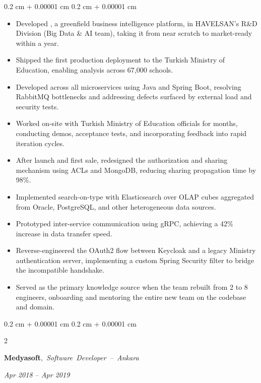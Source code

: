 \documentclass[10pt, letterpaper]{article}
\newenvironment{highlights}{
    \begin{itemize}[
        topsep=0.10 cm,
        parsep=0.10 cm,
        partopsep=0pt,
        itemsep=0pt,
        leftmargin=0.4 cm + 10pt
    ]
}{
    \end{itemize}
} %
\newenvironment{onecolentry}{
    \begin{adjustwidth}{
        0.2 cm + 0.00001 cm
    }{
        0.2 cm + 0.00001 cm
    }
}{
    \end{adjustwidth}
} %
\newenvironment{twocolentry}[2][]{
    \onecolentry
    \def\secondColumn{#2}
    \setcolumnwidth{\fill, 4.5 cm}
    \begin{paracol}{2}
}{
    \switchcolumn \raggedleft \secondColumn
    \end{paracol}
    \endonecolentry
} %
\let\hrefWithoutArrow\href
\renewcommand{\href}[2]{\hrefWithoutArrow{#1}{\ifthenelse{\equal{#2}{}}{ }{#2 }\raisebox{.15ex}{\footnotesize \faExternalLink*}}}
\begin{document}
        \vspace{0.10 cm}
        \begin{onecolentry}
            \begin{highlights}
            \item Developed \href{https://www.youtube.com/watch?v=YnbQ9wY3OYE}{Astar-BI}, a greenfield business intelligence platform, in HAVELSAN's R\&D Division (Big Data \& AI team), taking it from near scratch to market-ready within a year.
\item Shipped the first production deployment to the Turkish Ministry of Education, enabling analysis across \raisebox{0.3ex}{\scalebox{0.7}{$\sim$}}67,000 schools.
\item Developed across all microservices using Java and Spring Boot, resolving RabbitMQ bottlenecks and addressing defects surfaced by external load and security tests.
\pagebreak
\item Worked on-site with Turkish Ministry of Education officials for months, conducting demos, acceptance tests, and incorporating feedback into rapid iteration cycles.
\item After launch and first sale, redesigned the authorization and sharing mechanism using ACLs and MongoDB, reducing sharing propagation time by 98\%.
\item Implemented search-on-type with Elasticsearch over OLAP cubes aggregated from Oracle, PostgreSQL, and other heterogeneous data sources.
\item Prototyped inter-service communication using gRPC, achieving a 42\% increase in data transfer speed.
\item Reverse-engineered the OAuth2 flow between Keycloak and a legacy Ministry authentication server, implementing a custom Spring Security filter to bridge the incompatible handshake.
\item Served as the primary knowledge source when the team rebuilt from 2 to 8 engineers, onboarding and mentoring the entire new team on the codebase and domain.
            \end{highlights}
        \end{onecolentry}

        \vspace{0.35 cm}

        \begin{twocolentry}{
        \textit{Apr 2018 – Apr 2019}}
            \mbox{\textbf{Medyasoft},
            \textit{Software Developer -- Ankara}
            }
        \end{twocolentry}
\end{document}
